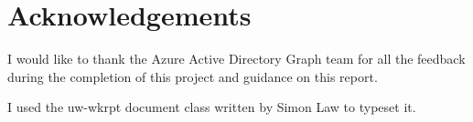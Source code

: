 \documentclass[se]{uw-wkrpt}
\begin{document}
\backmatter

%
\printbibliography[heading=bibintoc]

\section{Acknowledgements}
I would like to thank the Azure Active Directory Graph team for all the feedback during the completion of this project and guidance on this report.

I used the \textsf{uw-wkrpt} document class written by Simon Law to 
typeset it.
\end{document}
